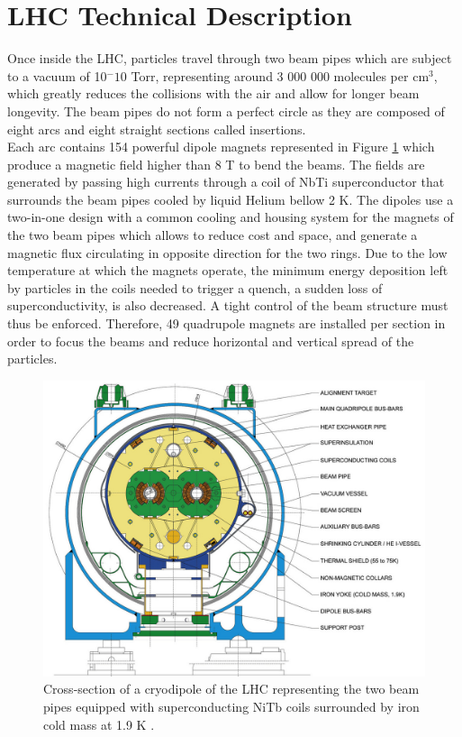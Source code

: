   \section{LHC Technical Description}

    Once inside the LHC, particles travel through two beam pipes which are subject to a vacuum of 10$^-{10}$ Torr, representing around 3 000 000 molecules per cm$^3$, which greatly reduces the collisions with the air and allow for longer beam longevity. The beam pipes do not form a perfect circle as they are composed of eight arcs and eight straight sections called insertions. \\

    Each arc contains 154 powerful dipole magnets represented in Figure \ref{fig:I-2-magnet} which produce a magnetic field higher than 8 T to bend the beams. The fields are generated by passing high currents through a coil of NbTi superconductor that surrounds the beam pipes cooled by liquid Helium bellow 2 K. The dipoles use a two-in-one design with a common cooling and housing system for the magnets of the two beam pipes which allows to reduce cost and space, and generate a magnetic flux circulating in opposite direction for the two rings. Due to the low temperature at which the magnets operate, the minimum energy deposition left by particles in the coils needed to trigger a quench, a sudden loss of superconductivity, is also decreased. A tight control of the beam structure must thus be enforced. Therefore, 49 quadrupole magnets are installed per section in order to focus the beams and reduce horizontal and vertical spread of the particles. \\

    \begin{figure}[h!]
			\centering
			\includegraphics[width=\textwidth]{img/I-2-LHC/magnet.jpg}
			\caption{Cross-section of a cryodipole of the LHC representing the two beam pipes equipped with superconducting NiTb coils surrounded by iron cold mass at 1.9 K \cite{Evans:2008zzb}.}
			\label{fig:I-2-magnet}
		\end{figure}

